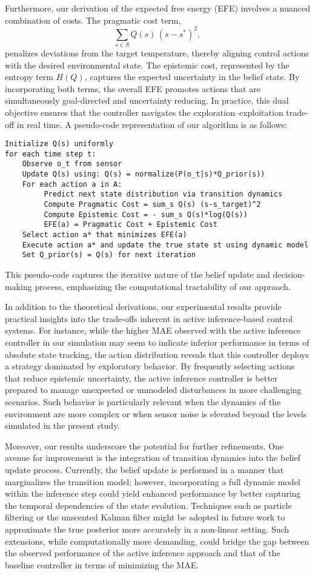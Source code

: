 \documentclass[11pt]{article}
\begin{document}
Furthermore, our derivation of the expected free energy (EFE) involves a nuanced combination of costs. The pragmatic cost term,
\[
\sum_{s \in S} Q(s)\,(s-s^*)^2,
\]
penalizes deviations from the target temperature, thereby aligning control actions with the desired environmental state. The epistemic cost, represented by the entropy term \(H(Q)\), captures the expected uncertainty in the belief state. By incorporating both terms, the overall EFE promotes actions that are simultaneously goal-directed and uncertainty reducing. In practice, this dual objective ensures that the controller navigates the exploration–exploitation trade-off in real time. A pseudo-code representation of our algorithm is as follows:
\begin{verbatim}
Initialize Q(s) uniformly
for each time step t:
    Observe o_t from sensor
    Update Q(s) using: Q(s) = normalize(P(o_t|s)*Q_prior(s))
    For each action a in A:
         Predict next state distribution via transition dynamics
         Compute Pragmatic Cost = sum_s Q(s) (s-s_target)^2
         Compute Epistemic Cost = - sum_s Q(s)*log(Q(s))
         EFE(a) = Pragmatic Cost + Epistemic Cost
    Select action a* that minimizes EFE(a)
    Execute action a* and update the true state st using dynamic model
    Set Q_prior(s) = Q(s) for next iteration
\end{verbatim}
This pseudo-code captures the iterative nature of the belief update and decision-making process, emphasizing the computational tractability of our approach.

In addition to the theoretical derivations, our experimental results provide practical insights into the trade-offs inherent in active inference-based control systems. For instance, while the higher MAE observed with the active inference controller in our simulation may seem to indicate inferior performance in terms of absolute state tracking, the action distribution reveals that this controller deploys a strategy dominated by exploratory behavior. By frequently selecting actions that reduce epistemic uncertainty, the active inference controller is better prepared to manage unexpected or unmodeled disturbances in more challenging scenarios. Such behavior is particularly relevant when the dynamics of the environment are more complex or when sensor noise is elevated beyond the levels simulated in the present study.

Moreover, our results underscore the potential for further refinements. One avenue for improvement is the integration of transition dynamics into the belief update process. Currently, the belief update is performed in a manner that marginalizes the transition model; however, incorporating a full dynamic model within the inference step could yield enhanced performance by better capturing the temporal dependencies of the state evolution. Techniques such as particle filtering or the unscented Kalman filter might be adopted in future work to approximate the true posterior more accurately in a non-linear setting. Such extensions, while computationally more demanding, could bridge the gap between the observed performance of the active inference approach and that of the baseline controller in terms of minimizing the MAE.
\end{document}
